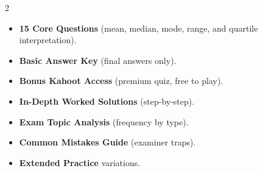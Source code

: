 \documentclass[11pt,a4paper]{article}
\newcommand{\FullReleaseDate}{April 30, 2026}
\begin{document}
\vspace{8pt}

\begin{multicols}{2}
  \begin{tcolorbox}[card, title=\sffamily\bfseries\textcolor{white}{\faHandPointDown\ TODAY (Simplified Version)}, colbacktitle=mainblue, boxed title style={sharp corners, boxrule=0pt}]
    \begin{itemize}[leftmargin=1.2em, itemsep=2pt]
      \item \small \textbf{15 Core Questions} (mean, median, mode, range, and quartile interpretation).
      \item \small \textbf{Basic Answer Key} (final answers only).
      \item \small \textbf{Bonus Kahoot Access} (premium quiz, free to play).
    \end{itemize}
  \end{tcolorbox}

  \columnbreak

  \begin{tcolorbox}[card, title=\sffamily\bfseries\textcolor{white}{\faRocket\ ON \FullReleaseDate\ (Full Upgrade)}, colbacktitle=mainblue, boxed title style={sharp corners, boxrule=0pt}]
    \begin{itemize}[leftmargin=1.2em, itemsep=2pt]
      \item \small \textbf{In-Depth Worked Solutions} (step-by-step).
      \item \small \textbf{Exam Topic Analysis} (frequency by type).
      \item \small \textbf{Common Mistakes Guide} (examiner traps).
      \item \small \textbf{Extended Practice} variations.
    \end{itemize}
  \end{tcolorbox}
\end{multicols}
\end{document}

